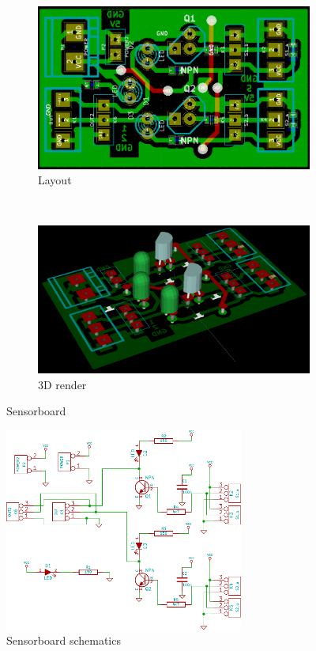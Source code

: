 \documentclass[a4paper
               ,10pt
               ,DIV=10 %
               ,BCOR=0.3cm
               ,pagesize %
               ,headings=small
               ,bibtotoc
               ]
               {scrartcl}
\begin{document}
\begin{figure}[H]
  \centering
  \begin{subfigure}[b]{0.5\textwidth}
  \centering
  \includegraphics[width=\textwidth]{pic/sensorboardbrd.png}
  \caption{Layout}
  \label{figsensorboard3d}
  \end{subfigure}~
  \begin{subfigure}[b]{0.5\textwidth}
  \centering
  \includegraphics[width=\textwidth]{pic/sensorboard3d.png}
  \caption{3D render}
  \label{figsensorboardscm}
  \end{subfigure}
  \caption{Sensorboard}
  \label{figsensorboard}
\end{figure}


\begin{figure}[htb]
\begin{center}
\includegraphics[width=0.7\textwidth]{pic/sensorboard}
\caption{Sensorboard schematics}
\end{center}
\label{figsensorboardscm}
\end{figure}
\end{document}

